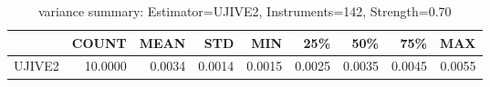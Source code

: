 \begin{table}[ht]
\centering
\caption{variance summary: Estimator=UJIVE2, Instruments=142, Strength=0.70}
\begin{tabular}{lrrrrrrrr}
\toprule
 & COUNT & MEAN & STD & MIN & 25\% & 50\% & 75\% & MAX \\
\midrule
UJIVE2 & 10.0000 & 0.0034 & 0.0014 & 0.0015 & 0.0025 & 0.0035 & 0.0045 & 0.0055 \\
\bottomrule
\end{tabular}
\end{table}
